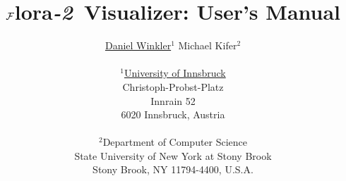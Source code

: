 \documentclass[a4paper,11pt]{article}
\newif\ifpdf
\newcommand{\FVIZ}{{\mbox{\sc ${\cal F}${lora}\rm\emph{-2} {Visualizer}}}\xspace}
\begin{document}
\ifpdf
	\DeclareGraphicsExtensions{.pdf,.jpg,.png}
\else
\fi


\title{\FVIZ: User's Manual}
\author{{\href{mailto:windan@gmx.at}{Daniel Winkler}$^1$ \hspace{1cm} Michael Kifer$^2$ }
\\\\
$^1$\href{http://uibk.ac.at}{University of Innsbruck}\\
Christoph-Probst-Platz\\
Innrain 52\\
6020 Innsbruck, Austria
\\\\ $^2$Department of Computer Science\\
State University of New York at Stony Brook\\
Stony Brook, NY 11794-4400, U.S.A. }
\maketitle



\newpage
\tableofcontents %
\clearpage %

\pagestyle{plain} %




\end{document}
